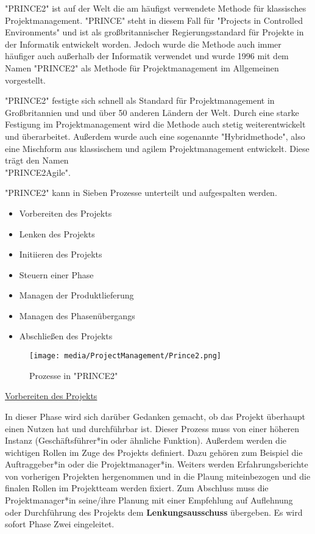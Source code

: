 
"PRINCE2" ist auf der Welt die am häufigst verwendete Methode für klassisches Projektmanagement. "PRINCE" steht in diesem Fall für "Projects in Controlled Environments" und ist als großbritannischer Regierungsstandard für Projekte in der Informatik entwickelt worden. Jedoch wurde die Methode auch immer häufiger auch außerhalb der Informatik verwendet und wurde 1996 mit dem Namen "PRINCE2" als Methode für Projektmanagement im Allgemeinen vorgestellt.

"PRINCE2" festigte sich schnell als Standard für Projektmanagement in Großbritannien und und über 50 anderen Ländern der Welt. Durch eine starke Festigung im Projektmanagement wird die Methode auch stetig weiterentwickelt und überarbeitet. Außerdem wurde auch eine sogenannte "Hybridmethode", also eine Mischform aus klassischem und agilem Projektmanagement entwickelt. Diese trägt den Namen\\ "PRINCE2Agile". \cite{Projectman.}


"PRINCE2" kann in Sieben Prozesse unterteilt und aufgespalten werden.

\begin{itemize}
    \item Vorbereiten des Projekts
    \item Lenken des Projekts
    \item Initiieren des Projekts
    \item Steuern einer Phase
    \item Managen der Produktlieferung
    \item Managen des Phasenübergangs
    \item Abschließen des Projekts
\end{itemize}

\begin{figure}[H]
    \centering
    \texttt{[image: media/ProjectManagement/Prince2.png]}
    \caption{Prozesse in "PRINCE2" \cite{Prince2}}
\end{figure}

\underline{Vorbereiten des Projekts}

In dieser Phase wird sich darüber Gedanken gemacht, ob das Projekt überhaupt einen Nutzen hat und durchführbar ist. Dieser Prozess muss von einer höheren Instanz (Geschäftsführer*in oder ähnliche Funktion). Außerdem werden die wichtigen Rollen im Zuge des Projekts definiert. Dazu gehören zum Beispiel die Auftraggeber*in oder die Projektmanager*in. Weiters werden Erfahrungsberichte von vorherigen Projekten hergenommen und in die Plaung miteinbezogen und die finalen Rollen im Projektteam werden fixiert. Zum Abschluss muss die Projektmanager*in seine/ihre Planung mit einer Empfehlung auf Auflehnung oder Durchführung des Projekts dem \textbf{Lenkungsausschuss} übergeben. Es wird sofort Phase Zwei eingeleitet. \cite{Prince2}

